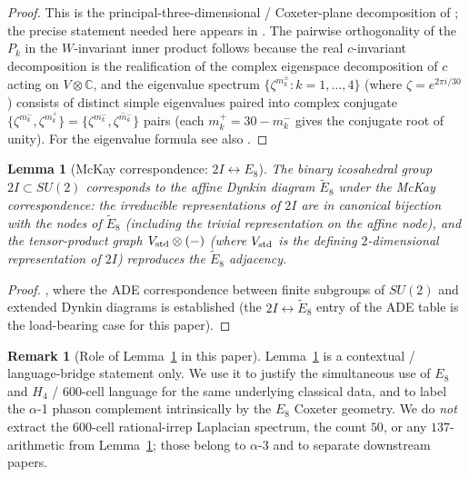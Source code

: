 \documentclass[11pt, a4paper]{amsart}
\newtheorem{lemma}[theorem]{Lemma}
\theoremstyle{definition}
\newtheorem{remark}[theorem]{Remark}
\newcommand{\C}{\mathbb{C}}
\begin{document}
\begin{proof}
This is the principal-three-dimensional / Coxeter-plane
decomposition of \cite{Kostant59}; the precise statement
needed here appears in \cite[Theorem~6.7 and the explicit
plane-wise rotation formula in \S 6.6--6.7,
pp.~983--988]{Kostant59}. The pairwise orthogonality of the
$P_k$ in the $W$-invariant inner product follows because the
real $c$-invariant decomposition is the realification of the
complex eigenspace decomposition of $c$ acting on $V \otimes
\C$, and the eigenvalue spectrum $\{\zeta^{m_k^\pm} : k = 1,
\ldots, 4\}$ (where $\zeta = e^{2\pi i / 30}$) consists of
distinct simple eigenvalues paired into complex conjugate
$\{\zeta^{m_k^-}, \zeta^{m_k^+}\} = \{\zeta^{m_k^-},
\overline{\zeta^{m_k^-}}\}$ pairs (each $m_k^+ = 30 - m_k^-$
gives the conjugate root of unity). For the eigenvalue
formula see also \cite[\S 3.20 Thm.~3.20 (the eigenvalues of
a Coxeter element)]{Humphreys}.
\end{proof}

\begin{lemma}[McKay correspondence: $2I \leftrightarrow E_8$]
\label{lem:McKay}
The binary icosahedral group $2I \subset SU(2)$ corresponds
to the affine Dynkin diagram $\widetilde{E}_8$ under the
McKay correspondence: the irreducible representations of
$2I$ are in canonical bijection with the nodes of
$\widetilde{E}_8$ (including the trivial representation on
the affine node), and the tensor-product graph
$V_{\rm std} \otimes (-)$ (where $V_{\rm std}$ is the
defining $2$-dimensional representation of $2I$)
reproduces the $\widetilde{E}_8$ adjacency.
\end{lemma}

\begin{proof}
\cite[\S 3, pp.~183--186]{McKay80}, where the ADE
correspondence between finite subgroups of $SU(2)$ and
extended Dynkin diagrams is established (the $2I
\leftrightarrow \widetilde E_8$ entry of the ADE table is
the load-bearing case for this paper).
\end{proof}

\begin{remark}[Role of Lemma~\ref{lem:McKay} in this paper]
\label{rmk:McKay-role}
Lemma~\ref{lem:McKay} is a contextual / language-bridge
statement only. We use it to justify the simultaneous use of
$E_8$ and $H_4$ / $600$-cell language for the same underlying
classical data, and to label the $\alpha$-1 phason complement
intrinsically by the $E_8$ Coxeter geometry. We do
\emph{not} extract the $600$-cell rational-irrep Laplacian
spectrum, the count $50$, or any $137$-arithmetic from
Lemma~\ref{lem:McKay}; those belong to $\alpha$-3 and to
separate downstream papers.
\end{remark}
\end{document}
